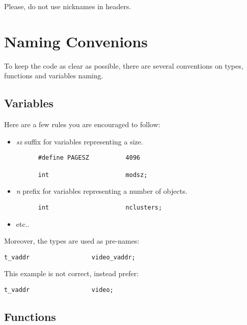 Please, do not use nicknames in headers.

%
%

\section{Naming Convenions}

To keep the code as clear as possible, there are several conventions on
types, functions and variables naming.

%
%

\subsection{Variables}

Here are a few rules you are encouraged to follow:

\begin{itemize}
  \item
    \textit{sz} suffix for variables representing a size.

    \begin{verbatim}
      #define PAGESZ          4096

      int                     modsz;
    \end{verbatim}
  \item
    \textit{n} prefix for variables representing a number of objects.

    \begin{verbatim}
      int                     nclusters;
    \end{verbatim}
  \item
    etc..
\end{itemize}

Moreover, the types are used as pre-names:

\begin{verbatim}
t_vaddr                 video_vaddr;
\end{verbatim}

This example is not correct, instead prefer:

\begin{verbatim}
t_vaddr                 video;
\end{verbatim}

%
%

\subsection{Functions}

